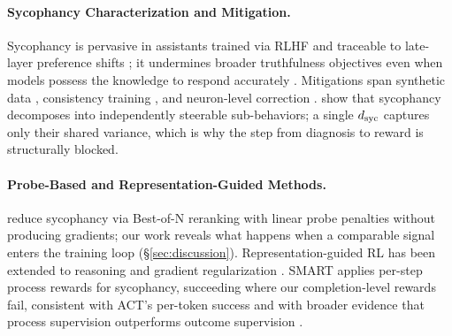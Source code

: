 \paragraph{Sycophancy Characterization and Mitigation.}
Sycophancy is pervasive in assistants trained via RLHF \citep{ouyang2022instructgpt, bai2022training, sharma2023sycophancy, perez2023discovering, shapira2026amplifies} and traceable to late-layer preference shifts \citep{wang2025internal}; it undermines broader truthfulness objectives \citep{lin2022truthfulqa} even when models possess the knowledge to respond accurately \citep{kadavath2022language}.
Mitigations span synthetic data \citep{wei2024synthetic}, consistency training \citep{consistency2025bctact}, and neuron-level correction \citep{obrien2025fewbadneurons}.
\citet{vennemeyer2025sycophancy} show that sycophancy decomposes into independently steerable sub-behaviors; a single $d_{\text{syc}}$ captures only their shared variance, which is why the step from diagnosis to reward is structurally blocked.

\paragraph{Probe-Based and Representation-Guided Methods.}
\citet{papadatos2024probepenalties} reduce sycophancy via Best-of-N reranking with linear probe penalties \citep[94\% accuracy; cf.][]{hewitt2019designing, belinkov2022probing} without producing gradients; our work reveals what happens when a comparable signal enters the training loop (\S\ref{sec:discussion}).
Representation-guided RL has been extended to reasoning and gradient regularization \citep{zhang2026latentgrpo, luo2026craft, sinii2025smallvectors, ackermann2026gradreg}.
SMART \citep{beigi2025smart} applies per-step process rewards for sycophancy, succeeding where our completion-level rewards fail, consistent with ACT's per-token success and with broader evidence that process supervision outperforms outcome supervision \citep{lightman2024verify, uesato2022solving}.
